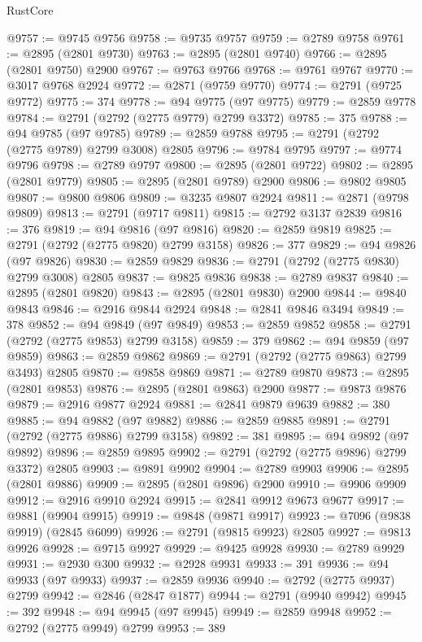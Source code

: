 \begin{lexlean}{RustCore}
\begin{coremodule}
@9757 := @9745 @9756
@9758 := @9735 @9757
@9759 := @2789 @9758
@9761 := @2895 (@2801 @9730)
@9763 := @2895 (@2801 @9740)
@9766 := @2895 (@2801 @9750) @2900
@9767 := @9763 @9766
@9768 := @9761 @9767
@9770 := @3017 @9768 @2924
@9772 := @2871 (@9759 @9770)
@9774 := @2791 (@9725 @9772)
@9775 := 374
@9778 := @94 @9775 (@97 @9775)
@9779 := @2859 @9778
@9784 := @2791 (@2792 (@2775 @9779) @2799 @3372)
@9785 := 375
@9788 := @94 @9785 (@97 @9785)
@9789 := @2859 @9788
@9795 := @2791 (@2792 (@2775 @9789) @2799 @3008) @2805
@9796 := @9784 @9795
@9797 := @9774 @9796
@9798 := @2789 @9797
@9800 := @2895 (@2801 @9722)
@9802 := @2895 (@2801 @9779)
@9805 := @2895 (@2801 @9789) @2900
@9806 := @9802 @9805
@9807 := @9800 @9806
@9809 := @3235 @9807 @2924
@9811 := @2871 (@9798 @9809)
@9813 := @2791 (@9717 @9811)
@9815 := @2792 @3137 @2839
@9816 := 376
@9819 := @94 @9816 (@97 @9816)
@9820 := @2859 @9819
@9825 := @2791 (@2792 (@2775 @9820) @2799 @3158)
@9826 := 377
@9829 := @94 @9826 (@97 @9826)
@9830 := @2859 @9829
@9836 := @2791 (@2792 (@2775 @9830) @2799 @3008) @2805
@9837 := @9825 @9836
@9838 := @2789 @9837
@9840 := @2895 (@2801 @9820)
@9843 := @2895 (@2801 @9830) @2900
@9844 := @9840 @9843
@9846 := @2916 @9844 @2924
@9848 := @2841 @9846 @3494
@9849 := 378
@9852 := @94 @9849 (@97 @9849)
@9853 := @2859 @9852
@9858 := @2791 (@2792 (@2775 @9853) @2799 @3158)
@9859 := 379
@9862 := @94 @9859 (@97 @9859)
@9863 := @2859 @9862
@9869 := @2791 (@2792 (@2775 @9863) @2799 @3493) @2805
@9870 := @9858 @9869
@9871 := @2789 @9870
@9873 := @2895 (@2801 @9853)
@9876 := @2895 (@2801 @9863) @2900
@9877 := @9873 @9876
@9879 := @2916 @9877 @2924
@9881 := @2841 @9879 @9639
@9882 := 380
@9885 := @94 @9882 (@97 @9882)
@9886 := @2859 @9885
@9891 := @2791 (@2792 (@2775 @9886) @2799 @3158)
@9892 := 381
@9895 := @94 @9892 (@97 @9892)
@9896 := @2859 @9895
@9902 := @2791 (@2792 (@2775 @9896) @2799 @3372) @2805
@9903 := @9891 @9902
@9904 := @2789 @9903
@9906 := @2895 (@2801 @9886)
@9909 := @2895 (@2801 @9896) @2900
@9910 := @9906 @9909
@9912 := @2916 @9910 @2924
@9915 := @2841 @9912 @9673 @9677
@9917 := @9881 (@9904 @9915)
@9919 := @9848 (@9871 @9917)
@9923 := @7096 (@9838 @9919) (@2845 @6099)
@9926 := @2791 (@9815 @9923) @2805
@9927 := @9813 @9926
@9928 := @9715 @9927
@9929 := @9425 @9928
@9930 := @2789 @9929
@9931 := @2930 @300
@9932 := @2928 @9931
@9933 := 391
@9936 := @94 @9933 (@97 @9933)
@9937 := @2859 @9936
@9940 := @2792 (@2775 @9937) @2799
@9942 := @2846 (@2847 @1877)
@9944 := @2791 (@9940 @9942)
@9945 := 392
@9948 := @94 @9945 (@97 @9945)
@9949 := @2859 @9948
@9952 := @2792 (@2775 @9949) @2799
@9953 := 389

\end{coremodule}
\end{lexlean}
